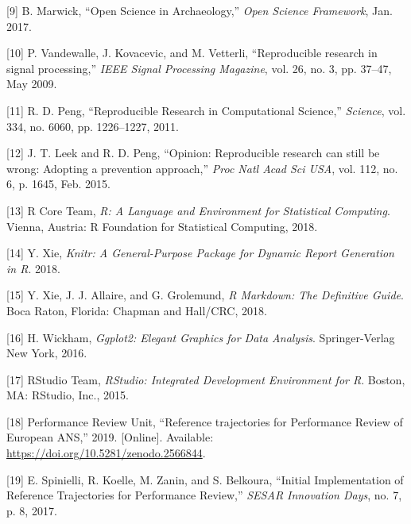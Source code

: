 \documentclass[conference,final,a4paper,]{IEEEtran}
\begin{document}
\leavevmode\hypertarget{ref-marwick_2017}{}%
{[}9{]} B. Marwick, ``Open Science in Archaeology,'' \emph{Open Science Framework}, Jan. 2017.

\leavevmode\hypertarget{ref-vandewalle_2009}{}%
{[}10{]} P. Vandewalle, J. Kovacevic, and M. Vetterli, ``Reproducible research in signal processing,'' \emph{IEEE Signal Processing Magazine}, vol. 26, no. 3, pp. 37--47, May 2009.

\leavevmode\hypertarget{ref-Peng1226}{}%
{[}11{]} R. D. Peng, ``Reproducible Research in Computational Science,'' \emph{Science}, vol. 334, no. 6060, pp. 1226--1227, 2011.

\leavevmode\hypertarget{ref-leek_2015}{}%
{[}12{]} J. T. Leek and R. D. Peng, ``Opinion: Reproducible research can still be wrong: Adopting a prevention approach,'' \emph{Proc Natl Acad Sci USA}, vol. 112, no. 6, p. 1645, Feb. 2015.

\leavevmode\hypertarget{ref-rcoreteam_2018}{}%
{[}13{]} R Core Team, \emph{R: A Language and Environment for Statistical Computing}. Vienna, Austria: R Foundation for Statistical Computing, 2018.

\leavevmode\hypertarget{ref-R-knitr}{}%
{[}14{]} Y. Xie, \emph{Knitr: A General-Purpose Package for Dynamic Report Generation in R}. 2018.

\leavevmode\hypertarget{ref-xie2018}{}%
{[}15{]} Y. Xie, J. J. Allaire, and G. Grolemund, \emph{R Markdown: The Definitive Guide}. Boca Raton, Florida: Chapman and Hall/CRC, 2018.

\leavevmode\hypertarget{ref-wickham_2016}{}%
{[}16{]} H. Wickham, \emph{Ggplot2: Elegant Graphics for Data Analysis}. Springer-Verlag New York, 2016.

\leavevmode\hypertarget{ref-rstudioteam_2015}{}%
{[}17{]} RStudio Team, \emph{RStudio: Integrated Development Environment for R}. Boston, MA: RStudio, Inc., 2015.

\leavevmode\hypertarget{ref-performancereviewunit_2019}{}%
{[}18{]} Performance Review Unit, ``Reference trajectories for Performance Review of European ANS,'' 2019. {[}Online{]}. Available: \url{https://doi.org/10.5281/zenodo.2566844}.

\leavevmode\hypertarget{ref-spinielli_2017}{}%
{[}19{]} E. Spinielli, R. Koelle, M. Zanin, and S. Belkoura, ``Initial Implementation of Reference Trajectories for Performance Review,'' \emph{SESAR Innovation Days}, no. 7, p. 8, 2017.
\end{document}
